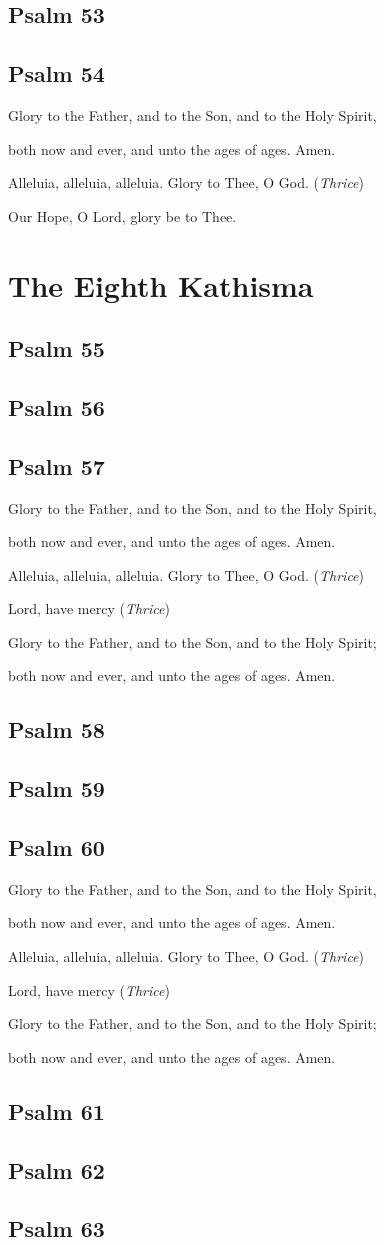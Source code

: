 \documentclass[12pt,openany]{book}
\newcommand{\kathismabreak}{
  \medskip
  \begin{center}
  \begin{footnotesize}
  Glory to the Father, and to the Son, and to the Holy Spirit,
  
  both now and ever, and unto the ages of ages. Amen.

  Alleluia, alleluia, alleluia. Glory to Thee, O God. (\textit{Thrice})

  Lord, have mercy (\textit{Thrice})

  Glory to the Father, and to the Son, and to the Holy Spirit;
  
  both now and ever, and unto the ages of ages. Amen.
  \end{footnotesize}
  \end{center}
  \smallbreak
}
\newcommand{\kathismaend}{
  \medskip
  \begin{center}
  \begin{footnotesize}
  Glory to the Father, and to the Son, and to the Holy Spirit,
  
  both now and ever, and unto the ages of ages. Amen.

  Alleluia, alleluia, alleluia. Glory to Thee, O God. (\textit{Thrice})

  Our Hope, O Lord, glory be to Thee.
  \end{footnotesize}
  \end{center}
  \smallbreak
}
\begin{document}
\section{Psalm 53}

\section{Psalm 54}


\kathismaend

\chapter*{The Eighth Kathisma}
\smallskip
\section{Psalm 55}

\smallskip
\section{Psalm 56}

\smallskip
\section{Psalm 57}


\kathismabreak
\smallskip
\section{Psalm 58}

\smallskip
\section{Psalm 59}

\smallskip
\section{Psalm 60}


\kathismabreak
\smallskip
\pagebreak %
\section{Psalm 61}

\smallskip
\section{Psalm 62}

\smallskip
\section{Psalm 63}

\end{document}
